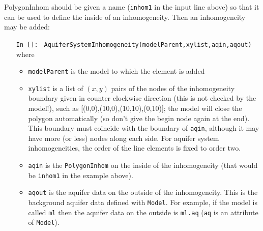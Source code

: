 \documentclass [10pt,letterpaper] {article}
\begin{document}
 PolygonInhom should be given a name ({\tt inhom1} in the input line above) so that it can be used to
    define the inside of an inhomogeneity. Then an inhomogeneity may be added:
\begin{itemize}
\item[{\tt In []:}] {\tt
AquiferSystemInhomogeneity(modelParent,xylist,aqin,aqout)} where
    \begin{itemize}
    \item {\tt modelParent} is the model to which the element is
    added
    \item {\tt xylist} is a list of $(x,y)$ pairs of the nodes of
    the inhomogeneity boundary given in counter clockwise
    direction (this is not checked by the model!), such as
    [(0,0),(10,0),(10,10),(0,10)]; the model will close the
    polygon automatically (so don't give the begin node again at
    the end). This boundary must coincide with the boundary of
    {\tt aqin}, although it may have more (or less) nodes along each
    side. For aquifer system inhomogeneities, the order of the line elements
    is fixed to order two.
    \item {\tt aqin} is the {\tt PolygonInhom} on the inside of the
    inhomogeneity (that would be {\tt inhom1} in the example
    above).
    \item {\tt aqout} is the aquifer data on the outside of the
    inhomogeneity. This is the background aquifer data defined
    with {\tt Model}. For example, if the model is called {\tt ml}
    then the aquifer data on the outside is {\tt ml.aq} ({\tt aq}
    is an attribute of {\tt Model}).
    \end{itemize}
\end{itemize}








\newpage
\end{document}
